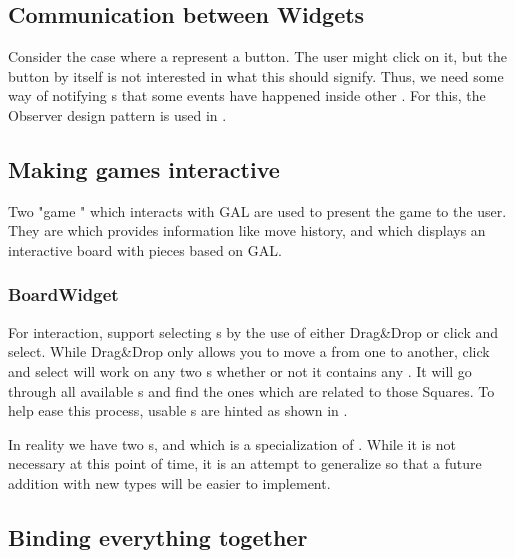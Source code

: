 \subsection{Communication between Widgets}

Consider the case where a  represent a button. The user might
click on it, but the button by itself is not interested in what this should
signify. Thus, we need some way of notifying s that some events
have happened inside other . For this, the Observer design
pattern is used in .

\subsection{Making games interactive}

Two "game " which interacts with GAL are used to present the
game to the user. They are  which provides information
like move history, and  which displays an interactive
board with pieces based on GAL.

\subsubsection{BoardWidget}

For interaction,  support selecting s by
the use of either Drag\&Drop or click and select. While Drag\&Drop only allows
you to move a  from one  to another, click and
select will work on any two s whether or not it contains any
. It will go through all available s and find
the ones which are related to those Squares. To help ease this process, usable
s are hinted as shown in .

In reality we have two s,  and
 which is a specialization of .
While it is not necessary at this point of time, it is an attempt to generalize
 so that a future addition with new  types
will be easier to implement.

\subsection{Binding everything together}

